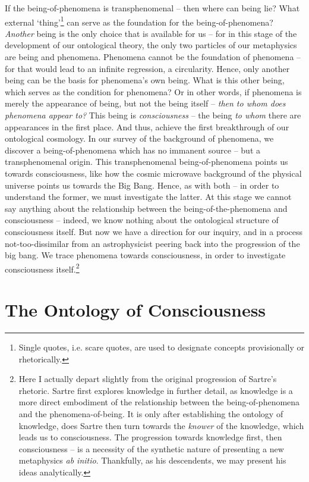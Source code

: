 If the being-of-phenomena is transphenomenal -- then where can being lie? What external \enquote*{thing}\footnote{Single quotes, i.e. scare quotes, are used to designate concepts provisionally or rhetorically.} can serve as the foundation for the being-of-phenomena? \emph{Another} being is the only choice that is available for us -- for in this stage of the development of our ontological theory, the only two particles of our metaphysics are being and phenomena. Phenomena cannot be the foundation of phenomena -- for that would lead to an infinite regression, a circularity. Hence, only another being can be the basis for phenomena's own being. What is this other being, which serves as the condition for phenomena? Or in other words, if phenomena is merely the appearance of being, but not the being itself -- \emph{then to whom does phenomena appear to?} This being is \emph{consciousness} -- the being \emph{to whom} there are appearances in the first place. And thus, achieve the first breakthrough of our ontological cosmology. In our survey of the background of phenomena, we discover a being-of-phenomena which has no immanent source -- but a transphenomenal origin. This transphenomenal being-of-phenomena points us towards consciousness, like how the cosmic microwave background of the physical universe points us towards the Big Bang. Hence, as with both -- in order to understand the former, we must investigate the latter. At this stage we cannot say anything about the relationship between the being-of-the-phenomena and consciousness -- indeed, we know nothing about the ontological structure of consciousness itself. But now we have a direction for our inquiry, and in a process not-too-dissimilar from an astrophysicist peering back into the progression of the big bang. We trace phenomena towards consciousness, in order to investigate consciousness itself.\footnote{Here I actually depart slightly from the original progression of Sartre's rhetoric. Sartre first explores knowledge in further detail, as knowledge is a more direct embodiment of the relationship between the being-of-phenomena and the phenomena-of-being. It is only after establishing the ontology of knowledge, does Sartre then turn towards the \emph{knower} of the knowledge, which leads us to consciousness. The progression towards knowledge first, then consciousness -- is a necessity of the synthetic nature of presenting a new metaphysics \emph{ab initio}. Thankfully, as his descendents, we may present his ideas analytically.}

\section{The Ontology of Consciousness}

